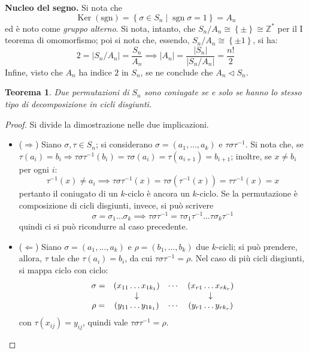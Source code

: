 \documentclass[11pt]{article}
\theoremstyle{style}
\newtheorem{teorema}{Teorema}[section]
\numberwithin{equation}{subsection}
\renewcommand{\textbf}[1]{\textsf{\bfseries #1}}
\begin{document}
\textbf{Nucleo del segno.} 
Si nota che 
\begin{equation}
	\operatorname{Ker} (\mathrm{sgn}) = \left\{ \sigma \in S_n  \mid \operatorname{sgn} \sigma  = 1\right\} = A_n
\end{equation}
ed \`e noto come \textit{gruppo alterno}. 
Si nota, intanto, che $S_n / A_n \cong \left\{ \pm \right\} \cong \mathbb{Z}^*$ per il I teorema di omomorfismo; poi si nota che, essendo, $S_n / A_n\cong \left\{ \pm 1 \right\} $, si ha:
\[
2 = \lvert S_n / A_n \rvert = \frac{S_n}{A_n} \implies \lvert A_n \rvert = \frac{\lvert S_n \rvert }{\lvert S_n / A_n \rvert } = \frac{n!}{2}
\] 
Infine, visto che $A_n$ ha indice $2$ in $S_n$, se ne conclude che $A_ n \lhd S_n$.
\vspace{5pt}

\begin{teorema}
	Due permutazioni di $S_n$ sono coniugate se e solo se hanno lo stesso tipo di decomposizione in cicli disgiunti.
\end{teorema}
	\begin{proof}
		Si divide la dimostrazione nelle due implicazioni.
		\begin{itemize}
			\item ($\Rightarrow $) Siano $\sigma , \tau \in S_n$; si considerano $\sigma = (a_1, \ldots, a_k)$ e $\tau \sigma \tau ^{-1}$.
				Si nota che, se $\tau (a_i) = b_i\Rightarrow \tau \sigma \tau ^{-1}(b_i) = \tau \sigma (a_i) = \tau (a_{i+1} ) =b_{i+1} $; inoltre, se $x \neq b_i $ per ogni $i$:
				\[
				\tau ^{-1}(x) \neq a_i \implies \tau \sigma \tau ^{-1}(x) = \tau \sigma \left(\tau ^{-1}(x)\right) =\tau \tau ^{-1}(x) = x
				\] 
				pertanto il coniugato di un $k$-ciclo \`e ancora un $k$-ciclo.
				Se la permutazione \`e composizione di cicli disgiunti, invece, si pu\`o scrivere 
				\[
				\sigma = \sigma _1 \ldots\sigma _k \implies \tau \sigma \tau ^{-1}= \tau \sigma _1\tau ^{-1}\ldots \tau \sigma _k\tau ^{-1}
				\] 
				quindi ci si pu\`o ricondurre al caso precedente.
			\item ($\Leftarrow$) Siano $\sigma  = (a_1,\ldots,a_k)$ e $\rho =(b_1,\ldots,b_k)$ due $k$-cicli; si pu\`o prendere, allora, $\tau $ tale che $\tau (a_i) = b_i$, da cui $\tau \sigma \tau ^{-1}=\rho $. 
				Nel caso di pi\`u cicli disgiunti, si mappa ciclo con ciclo:
				\[
				\begin{array}
					{c c c c}
					\sigma = &(x_{11} \ldots x_{1k_1} )&\cdots & (x_{r1} \ldots x_{rk_r} )\\
						 &\downarrow &  & \downarrow\\
					\rho = &(y_{11} \ldots y_{1k_1} ) & \cdots & (y_{r1} \ldots y_{r k_r} )
				\end{array}
				\] 
				con $\tau (x_{ij} ) = y_{ij} $, quindi vale $\tau \sigma \tau ^{-1}=\rho $.
		\end{itemize}
	\end{proof}
\end{document}
